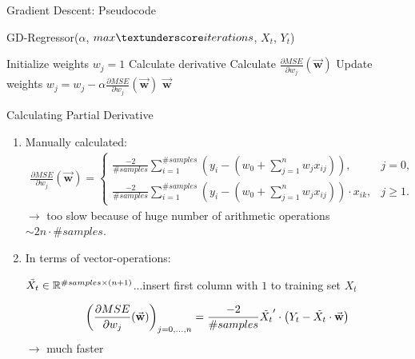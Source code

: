 \documentclass[10pt]{beamer}
\newcommand{\w}{\vec{\textbf{w}}}
\newcommand{\costder}{\frac{\partial MSE}{\partial w_j}(\w)}
\newcommand{\R}{\mathbb{R}}
\begin{document}
    \begin{frame}[fragile]{Gradient Descent: Pseudocode}
        \begin{algorithm}[H]
            \caption{GD-Regressor($\alpha$, $max\textunderscore iterations$, $X_{t}$, $Y_{t}$)}
			\begin{algorithmic}[1]
			    \Comment Initialize weights
			        \State $w_j=1$ 
			    \EndFor
    				\Comment Calculate derivative
    				    \State Calculate $\costder$
    				\EndFor
    				\Comment Update weights
    				    \State $w_j = w_j - \alpha \costder$
    				\EndFor
				\EndFor
				\State \Return $\w$
			\end{algorithmic}
		\end{algorithm}
    \end{frame}
    
    \begin{frame}[fragile]{Calculating Partial Derivative}
        \begin{enumerate}
            \item Manually calculated:
                \begin{align*}
                    \costder = \left\{
                    	\begin{array}{ll}
                    		\frac{-2}{\#samples} \sum_{i=1}^{\#samples}(y_i - (w_0 + \sum_{j=1}^{n}w_{j} x_{ij})), & j=0, \\
                    		\frac{-2}{\#samples} \sum_{i=1}^{\#samples}(y_i - (w_0 + \sum_{j=1}^{n}w_{j} x_{ij}))\cdot x_{ik},  & j \geq 1.
                    	\end{array}
                    \right.
                \end{align*}
                $\rightarrow$ too slow because of huge number of arithmetic operations $\sim 2n \cdot \#samples$.
                
            \item In terms of vector-operations: 
            
                $\Tilde{X_t} \in \R^{\#samples \times (n+1)}$...insert first column with $1$ to training set $X_t$
                
                \begin{align*}
                    \left( \costder \right)_{j=0,...,n} = \frac{-2}{\#samples} \Tilde{X_t}' \cdot \left(Y_t - \Tilde{X_t} \cdot \w \right) 
                \end{align*}
                $\rightarrow$ much faster
        \end{enumerate}
    \end{frame}
    
\end{document}

